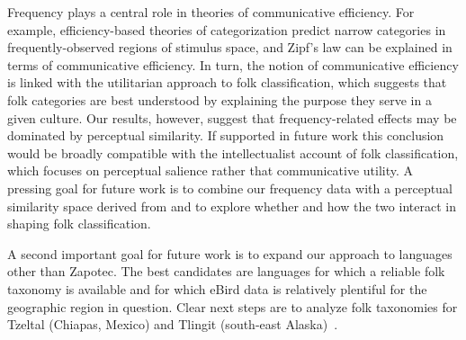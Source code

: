 \documentclass[10pt,letterpaper]{article}
\begin{document}
Frequency plays a central role in theories of communicative efficiency. For example, efficiency-based theories of categorization predict narrow categories in frequently-observed regions of stimulus space, and Zipf's law can be explained in terms of communicative efficiency. In turn, the notion of communicative efficiency is linked with the utilitarian approach to folk classification, which suggests that folk categories are best understood by explaining the purpose they serve in a given culture. Our results, however, suggest that frequency-related effects may be dominated by perceptual similarity. If supported in future work this conclusion would be broadly compatible with the intellectualist account of folk classification, which focuses on perceptual salience rather that communicative utility. A pressing goal for future work is to combine our frequency data with a perceptual similarity space derived from \cite{pigot2020macroevolutionary} and to explore whether and how the two interact in shaping folk classification. 

A second important goal for future work is to expand our approach to languages other than Zapotec. The best candidates are languages for which a reliable folk taxonomy is available and for which eBird data  
is relatively plentiful for the geographic region in question.  Clear next steps are to analyze folk taxonomies for Tzeltal (Chiapas, Mexico)  and Tlingit (south-east Alaska)~\cite{hunn1977tzeltal,hunn2012tlingit}.





\end{document}
